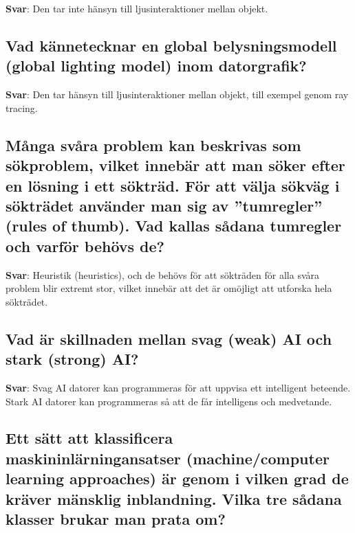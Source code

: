 \documentclass[a4paper,11pt,oneside]{article}
\begin{document}
\begin{sloppypar}
\textbf{Svar}: Den tar inte h\"ansyn till ljusinteraktioner mellan objekt.



\subsection{Vad k\"annetecknar en global belysningsmodell (global lighting model) inom datorgrafik?}

\label{q:310:sa:sv:True}

\textbf{Svar}: Den tar h\"ansyn till ljusinteraktioner mellan objekt, till exempel genom ray tracing.



\subsection{M\r{a}nga sv\r{a}ra problem kan beskrivas som s\"okproblem, vilket inneb\"ar att man s\"oker efter en l\"osning i ett s\"oktr\"ad. F\"or att v\"alja s\"okv\"ag i s\"oktr\"adet anv\"ander man sig av {\textquotedblright}tumregler{\textquotedblright} (rules of thumb). Vad kallas s\r{a}dana tumregler och varf\"or beh\"ovs de?}

\label{q:311:sa:sv:True}

\textbf{Svar}: Heuristik (heuristics), och de beh\"ovs f\"or att s\"oktr\"aden f\"or alla sv\r{a}ra problem blir extremt stor, vilket inneb\"ar att det \"ar om\"ojligt att utforska hela s\"oktr\"adet.



\subsection{Vad \"ar skillnaden mellan svag (weak) AI och stark (strong) AI?}

\label{q:312:sa:sv:True}

\textbf{Svar}: Svag AI {\textendash} datorer kan programmeras f\"or att uppvisa ett intelligent beteende. Stark AI {\textendash} datorer kan programmeras s\r{a} att de f\r{a}r intelligens och medvetande.



\subsection{Ett s\"att att klassificera maskininl\"arningansatser (machine/computer learning approaches) \"ar genom i vilken grad de kr\"aver m\"ansklig inblandning. Vilka tre s\r{a}dana klasser brukar man prata om?}


\end{sloppypar}
\end{document}
